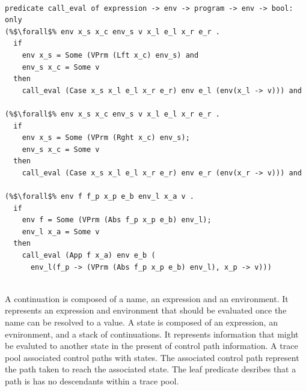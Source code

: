 \documentclass{article}
\begin{document}
\begin{lstlisting}[language=logic, escapechar=\%]

predicate call_eval of expression -> env -> program -> env -> bool:
only
(%$\forall$% env x_s x_c env_s v x_l e_l x_r e_r .
  if
    env x_s = Some (VPrm (Lft x_c) env_s) and
    env_s x_c = Some v
  then
    call_eval (Case x_s x_l e_l x_r e_r) env e_l (env(x_l -> v))) and

(%$\forall$% env x_s x_c env_s v x_l e_l x_r e_r .
  if 
    env x_s = Some (VPrm (Rght x_c) env_s); 
    env_s x_c = Some v
  then
    call_eval (Case x_s x_l e_l x_r e_r) env e_r (env(x_r -> v))) and

(%$\forall$% env f f_p x_p e_b env_l x_a v .
  if 
    env f = Some (VPrm (Abs f_p x_p e_b) env_l); 
    env_l x_a = Some v
  then
    call_eval (App f x_a) env e_b (
      env_l(f_p -> (VPrm (Abs f_p x_p e_b) env_l), x_p -> v)))
  

\end{lstlisting}
  

A continuation is composed of a name, an expression and an environment.  It represents an
expression and environment that should be evaluated once the name can be resolved to a value.
A state is composed of an expression, an evnironment, and a stack of continuations.
It represents information that might be evaluted to another state in the present of control
path information.  A trace pool associated control paths with states.  The associated control
path represent the path taken to reach the associated state. The leaf predicate desribes that a
path is has no descendants within a trace pool.  
\end{document}
